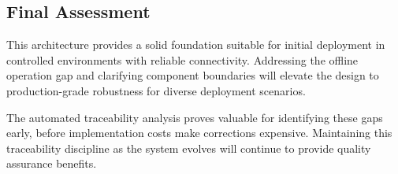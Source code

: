 \documentclass[11pt,a4paper]{article}
\begin{document}
\subsection{Final Assessment}

This architecture provides a solid foundation suitable for initial deployment in controlled environments with reliable connectivity. Addressing the offline operation gap and clarifying component boundaries will elevate the design to production-grade robustness for diverse deployment scenarios.

The automated traceability analysis proves valuable for identifying these gaps early, before implementation costs make corrections expensive. Maintaining this traceability discipline as the system evolves will continue to provide quality assurance benefits.
\end{document}
